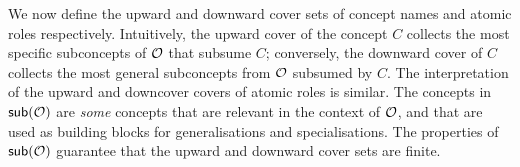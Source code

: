 \documentclass[
]{ceurart}
\begin{document}


%
%

We now define the upward and downward cover sets of concept names and atomic roles respectively. %
%
Intuitively,  the upward cover of the concept $C$ collects the  most specific subconcepts of %
$\mathcal{O}$ that subsume $C$; conversely, the  downward cover of $C$ collects the most general 
subconcepts from  %
$\mathcal{O}$ subsumed by $C$. 
The interpretation of the upward and downcover covers of atomic roles is similar. 
The concepts in $\mathop{\mathsf{sub}}(\mathcal{O})$ are \emph{some} concepts that are relevant in the context of 
$\mathcal{O}$, and that are used as building blocks for generalisations and specialisations. 
%
The properties of $\mathop{\mathsf{sub}}(\mathcal{O})$  
guarantee that the upward and downward cover sets are finite.
\end{document}
